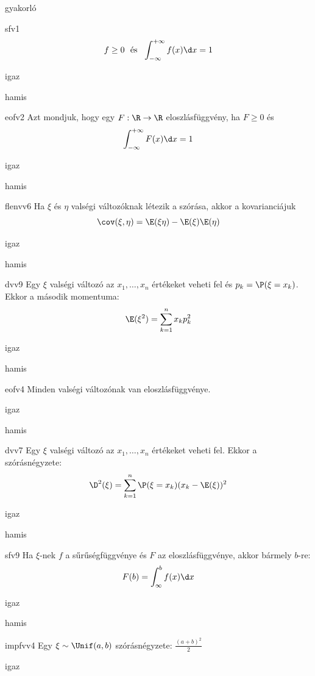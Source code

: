 \documentclass[12pt]{article}
\begin{document}
\begin{quiz}{gyakorló}
\begin{multi}[feedback={Def.}]{sfv1}
$$
f\ge 0 \ \ \text{és}\ \ \int_{-\infty}^{+\infty}f(x)\d x=1
$$
\item* igaz
\item hamis
\end{multi}
\begin{multi}[feedback={Ebből nem jön ki a pl. a monotonitás vagy a balról folytonosság.}]{eofv2}
Azt mondjuk, hogy egy $F:\R\to \R$ eloszlásfüggvény, ha $F\ge 0$ és 
$$
\int_{-\infty}^{+\infty}F(x)\d x=1
$$
\item igaz
\item* hamis
\end{multi}
\begin{multi}[feedback={Tulajdonság.}]{flenvv6}
Ha $\xi$ és $\eta$ valségi változóknak létezik a szórása, akkor a 
kovarianciájuk
$$
\cov(\xi,\eta)=\E(\xi\eta)-\E(\xi)\E(\eta)
$$
\item* igaz
\item hamis
\end{multi}
\begin{multi}[feedback={Def.}]{dvv9}
Egy $\xi$ valségi változó az $x_1,\ldots, x_n$ értékeket veheti fel és $p_k=\P(\xi=x_k)$. 
Ekkor a második momentuma:
$$
\E(\xi^2)=\sum_{k=1}^n x_k p_k^2
$$
\item igaz
\item* hamis
\end{multi}
\begin{multi}[feedback={Hiszen $F(x)=\P(\xi<x)$, és ez mindig értelmes.}]{eofv4}
Minden valségi változónak van eloszlásfüggvénye.
\item* igaz
\item hamis
\end{multi}
\begin{multi}[feedback={Def.}]{dvv7}
Egy $\xi$ valségi változó az $x_1,\ldots, x_n$ értékeket veheti fel. Ekkor a szórásnégyzete:
$$
\D^2(\xi)=\sum_{k=1}^n \P(\xi=x_k)(x_k-\E(\xi))^2
$$
\item* igaz
\item hamis
\end{multi}
\begin{multi}[feedback={Def.}]{sfv9}
Ha $\xi$-nek $f$ a sűrűségfüggvénye és $F$ az eloszlásfüggvénye, akkor bármely $b$-re:
$$
F(b)=\int_{\infty}^{b}f(x)\d x
$$
\item* igaz
\item hamis
\end{multi}
\begin{multi}[feedback={wiki}]{impfvv4}
Egy $\xi\sim \Unif(a,b)$ szórásnégyzete: $\frac{(a+b)^2}{2}$
\item igaz

\end{multi}
\end{quiz}
\end{document}
